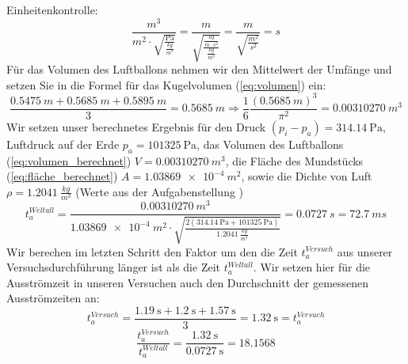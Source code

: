 \documentclass{article}
\begin{document}
        Einheitenkontrolle:
        \begin{equation}
            \frac{\si{m^3}}{\si{m^2} \cdot \sqrt{\frac{ \si{\pascal} }{ \frac{\si{kg}}{\si{m^3}} } }} =
            \frac{\si{m}}{ \sqrt{\frac{\frac{\si{kg}}{\si{m}\cdot\si{s^2}}}{\frac{\si{kg}}{\si{m^3}}}} } =
            \frac{\si{m}}{\sqrt{\frac{\si{m^2}}{\si{s^2}}}} = \si{s}
        \end{equation}
        Für das Volumen des Luftballons nehmen wir den Mittelwert der Umfänge und setzen Sie in die Formel für das Kugelvolumen (\ref{eq:volumen}) ein:
        \begin{equation} \label{eq:volumen_berechnet}
            \frac{ \SI{0.5475}{m} + \SI{0.5685}{m} + \SI{0.5895}{m} }{3} = \SI{0.5685}{m} \Rightarrow \frac{1}{6} \frac{ {\left( \SI{0.5685}{m} \right)}^3}{\pi^2} = \SI{0.00310270}{m^3}
        \end{equation}
        Wir setzen unser berechnetes Ergebnis für den Druck \(\left(p_i - p_a\right) = \SI{314.14}{\pascal} \), Luftdruck auf der Erde \(p_a = \SI{101325}{\pascal} \),
        das Volumen des Luftballons (\ref{eq:volumen_berechnet}) \(V = \SI{0.00310270}{m^3}\),
        die Fläche des Mundstücks (\ref{eq:fläche_berechnet}) \( A = \SI{1.03869e-4}{m^2} \),
        sowie die Dichte von Luft \( \rho = \SI{1.2041}{\frac{kg}{m^3}} \) (Werte aus der Aufgabenstellung \cite{AnleitungPraktikum})
        \begin{equation}
            t_a^{Weltall} = \frac{ \SI{0.00310270}{m^3} }{ \SI{1.03869e-4}{m^2} \cdot \sqrt{ \frac{ 2(\SI{314.14}{\pascal} + \SI{101325}{\pascal})}{ \SI{1.2041}{\frac{kg}{m^3}} }} }
             = \SI{0.0727}{s} = \SI{72.7}{ms}
        \end{equation}
        Wir berechen im letzten Schritt den Faktor um den die Zeit \(t_a^{Versuch}\) aus unserer Versuchsdurchführung länger ist als die Zeit \(t_a^{Weltall}\).
        Wir setzen hier für die Ausströmzeit in unseren Versuchen auch den Durchschnitt der gemessenen Ausströmzeiten an:
        \begin{equation}
            t_a^{Versuch} = \frac{ \SI{1.19}{\second} + \SI{1.2}{\second} + \SI{1.57}{\second} }{3} = \SI{1.32}{\second} = t_a^{Versuch}
        \end{equation}
        \begin{equation}
            \frac{t_a^{Versuch}}{t_a^{Weltall}} = \frac{ \SI{1.32}{\second} }{ \SI{0.0727}{\second} } = 18.1568
        \end{equation}
\end{document}
